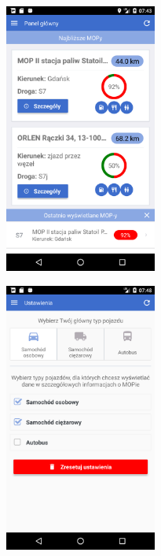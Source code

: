 \begin{figure}[!htb]
\centering
\begin{minipage}{.5\textwidth}
  \centering
  \includegraphics[width=5cm]{images/mopsik_mobile/home.png}
  \label{mopsik_home}
\end{minipage}%
\begin{minipage}{.5\textwidth}
  \centering
  \includegraphics[width=5cm]{images/mopsik_mobile/settings.png}
  \label{mopsik_settings}
\end{minipage}
\end{figure}

